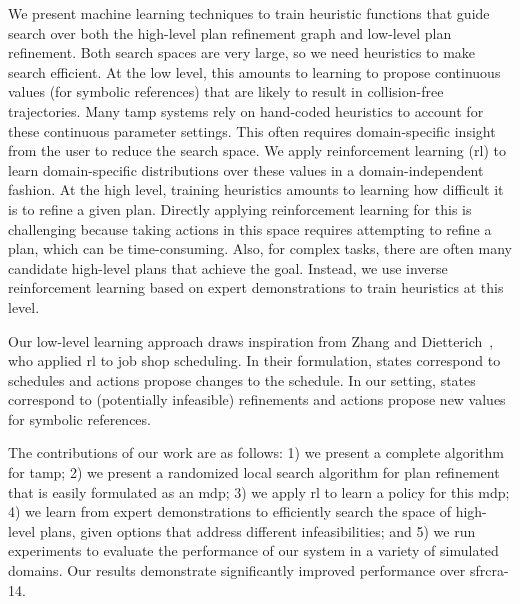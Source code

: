 We present machine learning techniques to train heuristic functions that guide
search over both the high-level plan refinement graph and low-level plan refinement.
Both search spaces are very large, so we need heuristics to make search efficient.
At the low level, this amounts to
learning to propose continuous values (for symbolic references) that are likely to result in
collision-free trajectories. Many {\sc tamp} systems rely on hand-coded heuristics to
account for these continuous parameter settings. This often requires
domain-specific insight from the user to reduce the search space.
We apply reinforcement learning ({\sc rl}) to learn domain-specific distributions
over these values in a domain-independent fashion.
At the high level, training heuristics amounts to learning
how difficult it is to refine a given plan. Directly applying reinforcement learning
for this is challenging because taking actions in this space requires attempting to
refine a plan, which can be time-consuming. Also, for complex tasks, there are often many candidate high-level plans that
achieve the goal. Instead, we use inverse reinforcement learning
based on expert demonstrations to train heuristics at this level.

Our low-level learning approach draws inspiration
from Zhang and Dietterich~\cite{JobShopSched}, who applied {\sc rl} to job
shop scheduling. In their formulation, states correspond to schedules
and actions propose changes to the schedule. In our setting, states
correspond to (potentially infeasible) refinements and actions propose
new values for symbolic references.

The contributions of our work are as follows: 1)
we present a complete algorithm for {\sc tamp}; 2) we present a randomized
local search algorithm for plan refinement that is easily formulated
as an {\sc mdp}; 3) we apply {\sc rl} to learn
a policy for this {\sc mdp}; 4) we learn from expert demonstrations to
efficiently search the space of high-level plans,
given options that address different infeasibilities; and 5)
we run experiments to evaluate the performance of our system in a
variety of simulated domains. Our results demonstrate
significantly improved performance over {\sc sfrcra-14}.